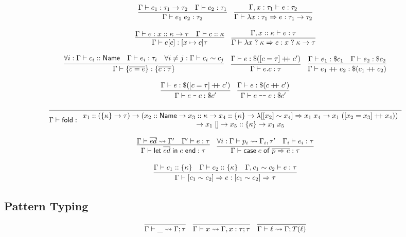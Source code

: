 \documentclass{article}
\newcommand{\mt}[1]{\mathsf{#1}}
\newcommand{\rc}{+ \hspace{-.075in} + \;}
\newcommand{\rcut}{\; \texttt{--} \;}
\newcommand{\rcutM}{\; \texttt{---} \;}
\begin{document}
$$\infer{\Gamma \vdash e_1 \; e_2 : \tau_2}{
  \Gamma \vdash e_1 : \tau_1 \to \tau_2
  & \Gamma \vdash e_2 : \tau_1
}
\quad \infer{\Gamma \vdash \lambda x : \tau_1 \Rightarrow e : \tau_1 \to \tau_2}{
  \Gamma, x : \tau_1 \vdash e : \tau_2
}$$

$$\infer{\Gamma \vdash e [c] : [x \mapsto c]\tau}{
  \Gamma \vdash e : x :: \kappa \to \tau
  & \Gamma \vdash c :: \kappa
}
\quad \infer{\Gamma \vdash \lambda x \; ? \; \kappa \Rightarrow e : x \; ? \; \kappa \to \tau}{
  \Gamma, x :: \kappa \vdash e : \tau
}$$

$$\infer{\Gamma \vdash \{\overline{c = e}\} : \{\overline{c : \tau}\}}{
  \forall i: \Gamma \vdash c_i :: \mt{Name}
  & \Gamma \vdash e_i : \tau_i
  & \forall i \neq j: \Gamma \vdash c_i \sim c_j
}
\quad \infer{\Gamma \vdash e.c : \tau}{
  \Gamma \vdash e : \$([c = \tau] \rc c')
}
\quad \infer{\Gamma \vdash e_1 \rc e_2 : \$(c_1 \rc c_2)}{
  \Gamma \vdash e_1 : \$c_1
  & \Gamma \vdash e_2 : \$c_2
}$$

$$\infer{\Gamma \vdash e \rcut c : \$c'}{
  \Gamma \vdash e : \$([c = \tau] \rc c')
}
\quad \infer{\Gamma \vdash e \rcutM c : \$c'}{
  \Gamma \vdash e : \$(c \rc c')
}$$

$$\infer{\Gamma \vdash \mt{fold} : \begin{array}{c}
    x_1 :: (\{\kappa\} \to \tau)
    \to (x_2 :: \mt{Name} \to x_3 :: \kappa \to x_4 :: \{\kappa\} \to \lambda [[x_2] \sim x_4]
    \Rightarrow x_1 \; x_4 \to x_1 \; ([x_2 = x_3] \rc x_4)) \\
    \to x_1 \; [] \to x_5 :: \{\kappa\} \to x_1 \; x_5
  \end{array}}{}$$

$$\infer{\Gamma \vdash \mt{let} \; \overline{ed} \; \mt{in} \; e \; \mt{end} : \tau}{
  \Gamma \vdash \overline{ed} \leadsto \Gamma'
  & \Gamma' \vdash e : \tau
}
\quad \infer{\Gamma \vdash \mt{case} \; e \; \mt{of} \; \overline{p \Rightarrow e} : \tau}{
  \forall i: \Gamma \vdash p_i \leadsto \Gamma_i, \tau'
  & \Gamma_i \vdash e_i : \tau
}$$

$$\infer{\Gamma \vdash [c_1 \sim c_2] \Rightarrow e : [c_1 \sim c_2] \Rightarrow \tau}{
  \Gamma \vdash c_1 :: \{\kappa\}
  & \Gamma \vdash c_2 :: \{\kappa\}
  & \Gamma, c_1 \sim c_2 \vdash e : \tau
}$$

\subsection{Pattern Typing}

$$\infer{\Gamma \vdash \_ \leadsto \Gamma; \tau}{}
\quad \infer{\Gamma \vdash x \leadsto \Gamma, x : \tau; \tau}{}
\quad \infer{\Gamma \vdash \ell \leadsto \Gamma; T(\ell)}{}$$
\end{document}
